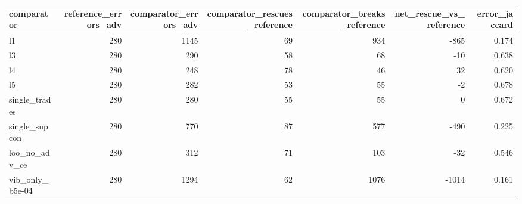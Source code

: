 \begin{tabular}{lrrrrrr}
\toprule
comparator & reference_errors_adv & comparator_errors_adv & comparator_rescues_reference & comparator_breaks_reference & net_rescue_vs_reference & error_jaccard \\
\midrule
l1 & 280 & 1145 & 69 & 934 & -865 & 0.174 \\
l3 & 280 & 290 & 58 & 68 & -10 & 0.638 \\
l4 & 280 & 248 & 78 & 46 & 32 & 0.620 \\
l5 & 280 & 282 & 53 & 55 & -2 & 0.678 \\
single_trades & 280 & 280 & 55 & 55 & 0 & 0.672 \\
single_supcon & 280 & 770 & 87 & 577 & -490 & 0.225 \\
loo_no_adv_ce & 280 & 312 & 71 & 103 & -32 & 0.546 \\
vib_only_b5e-04 & 280 & 1294 & 62 & 1076 & -1014 & 0.161 \\
\bottomrule
\end{tabular}
